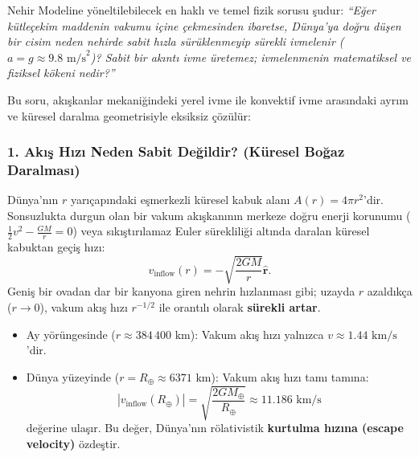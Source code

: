 Nehir Modeline yöneltilebilecek en haklı ve temel fizik sorusu şudur:
\textit{``Eğer kütleçekim maddenin vakumu içine çekmesinden ibaretse, Dünya'ya doğru düşen bir cisim neden nehirde sabit hızla sürüklenmeyip sürekli ivmelenir ($a = g \approx 9.8\text{ m/s}^2$)? Sabit bir akıntı ivme üretemez; ivmelenmenin matematiksel ve fiziksel kökeni nedir?''}

Bu soru, akışkanlar mekaniğindeki yerel ivme ile konvektif ivme arasındaki ayrım ve küresel daralma geometrisiyle eksiksiz çözülür:

\subsubsection{1. Akış Hızı Neden Sabit Değildir? (Küresel Boğaz Daralması)}
Dünya'nın $r$ yarıçapındaki eşmerkezli küresel kabuk alanı $A(r) = 4\pi r^2$'dir. Sonsuzlukta durgun olan bir vakum akışkanının merkeze doğru enerji korunumu ($\frac{1}{2} v^2 - \frac{GM}{r} = 0$) veya sıkıştırılamaz Euler sürekliliği altında daralan küresel kabuktan geçiş hızı:
\begin{equation}
    v_{\mathrm{inflow}}(r) = -\sqrt{\frac{2GM}{r}} \hat{\mathbf{r}}.
    \label{eq:akis_hizi_tekrar}
\end{equation}
Geniş bir ovadan dar bir kanyona giren nehrin hızlanması gibi; uzayda $r$ azaldıkça ($r \to 0$), vakum akış hızı $r^{-1/2}$ ile orantılı olarak \textbf{sürekli artar}.
\begin{itemize}
    \item Ay yörüngesinde ($r \approx 384\,400\text{ km}$): Vakum akış hızı yalnızca $v \approx 1.44\text{ km/s}$'dir.
    \item Dünya yüzeyinde ($r = R_\oplus \approx 6371\text{ km}$): Vakum akış hızı tamı tamına:
          \begin{equation}
              |v_{\mathrm{inflow}}(R_\oplus)| = \sqrt{\frac{2GM_\oplus}{R_\oplus}} \approx 11.186\text{ km/s}
              \label{eq:kurtulma_hizi_ispat}
          \end{equation}
          değerine ulaşır. Bu değer, Dünya'nın rölativistik \textbf{kurtulma hızına (escape velocity)} özdeştir.
\end{itemize}

